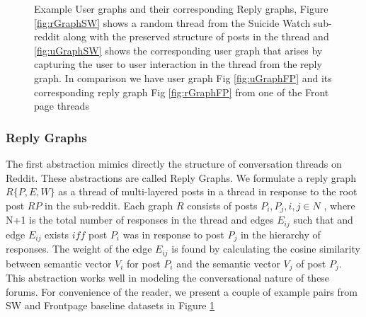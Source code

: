 \begin{figure}[!ht]
    
    \caption{ Example User graphs and their corresponding Reply graphs, Figure \ref{fig:rGraphSW} shows a random thread from the Suicide Watch sub-reddit along with the preserved structure of posts in the thread and \ref{fig:uGraphSW} shows the corresponding user graph that arises by capturing the user to user interaction in the thread from the reply graph. In comparison we have user graph Fig \ref{fig:uGraphFP} and its corresponding reply graph Fig \ref{fig:rGraphFP} from one of the Front page threads }
    \label{Fig:GraphExamples}
\end{figure}

\subsubsection{Reply Graphs}
\label{Sec:Reply_graphs}
The first abstraction mimics directly the structure of conversation threads on Reddit. These abstractions are called Reply Graphs. We formulate a reply graph $R\{P,E,W\}$ as a thread of multi-layered posts in a thread in response to the root post $RP$ in the sub-reddit. Each graph $R$ consists of posts $P_i , P_j , i,j \in N$ , where N+1 is the total number of responses in the thread and edges $E_{ij}$ such that and edge $E_{ij}$ exists $iff$ post $P_i$ was in response to post $P_j$ in the hierarchy of responses.  The weight of the edge $E_{ij}$ is found by calculating the cosine similarity between semantic vector $V_i$ for post $P_i$ and the semantic vector $V_j$ of post $P_j$.  This abstraction works well in modeling the conversational nature of these forums.  For convenience of the reader, we present a couple of example pairs from SW and Frontpage baseline datasets in Figure \ref{Fig:GraphExamples}

